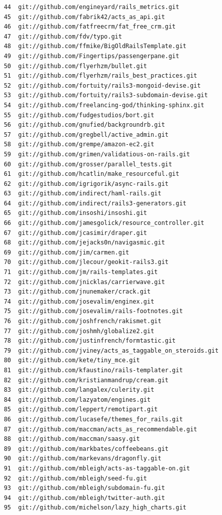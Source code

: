 \documentclass{cs-thesis}
\begin{document}
\begin{verbatim}
    44	git://github.com/engineyard/rails_metrics.git
    45	git://github.com/fabrik42/acts_as_api.git
    46	git://github.com/fatfreecrm/fat_free_crm.git
    47	git://github.com/fdv/typo.git
    48	git://github.com/ffmike/BigOldRailsTemplate.git
    49	git://github.com/Fingertips/passengerpane.git
    50	git://github.com/flyerhzm/bullet.git
    51	git://github.com/flyerhzm/rails_best_practices.git
    52	git://github.com/fortuity/rails3-mongoid-devise.git
    53	git://github.com/fortuity/rails3-subdomain-devise.git
    54	git://github.com/freelancing-god/thinking-sphinx.git
    55	git://github.com/fudgestudios/bort.git
    56	git://github.com/gnufied/backgroundrb.git
    57	git://github.com/gregbell/active_admin.git
    58	git://github.com/grempe/amazon-ec2.git
    59	git://github.com/grimen/validatious-on-rails.git
    60	git://github.com/grosser/parallel_tests.git
    61	git://github.com/hcatlin/make_resourceful.git
    62	git://github.com/igrigorik/async-rails.git
    63	git://github.com/indirect/haml-rails.git
    64	git://github.com/indirect/rails3-generators.git
    65	git://github.com/insoshi/insoshi.git
    66	git://github.com/jamesgolick/resource_controller.git
    67	git://github.com/jcasimir/draper.git
    68	git://github.com/jejacks0n/navigasmic.git
    69	git://github.com/jim/carmen.git
    70	git://github.com/jlecour/geokit-rails3.git
    71	git://github.com/jm/rails-templates.git
    72	git://github.com/jnicklas/carrierwave.git
    73	git://github.com/jnunemaker/crack.git
    74	git://github.com/josevalim/enginex.git
    75	git://github.com/josevalim/rails-footnotes.git
    76	git://github.com/joshfrench/rakismet.git
    77	git://github.com/joshmh/globalize2.git
    78	git://github.com/justinfrench/formtastic.git
    79	git://github.com/jviney/acts_as_taggable_on_steroids.git
    80	git://github.com/kete/tiny_mce.git
    81	git://github.com/kfaustino/rails-templater.git
    82	git://github.com/kristianmandrup/cream.git
    83	git://github.com/langalex/culerity.git
    84	git://github.com/lazyatom/engines.git
    85	git://github.com/leppert/remotipart.git
    86	git://github.com/lucasefe/themes_for_rails.git
    87	git://github.com/maccman/acts_as_recommendable.git
    88	git://github.com/maccman/saasy.git
    89	git://github.com/markbates/coffeebeans.git
    90	git://github.com/markevans/dragonfly.git
    91	git://github.com/mbleigh/acts-as-taggable-on.git
    92	git://github.com/mbleigh/seed-fu.git
    93	git://github.com/mbleigh/subdomain-fu.git
    94	git://github.com/mbleigh/twitter-auth.git
    95	git://github.com/michelson/lazy_high_charts.git

\end{verbatim}
\end{document}
